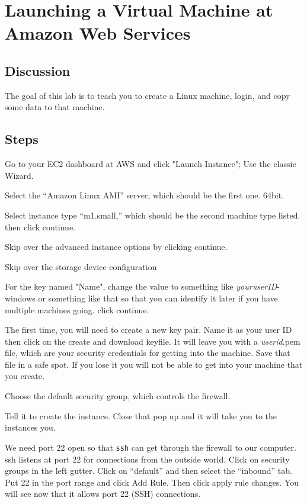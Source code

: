 \chapter{Launching a Virtual Machine at Amazon Web Services}
\label{ch:1}

\setcounter{problem}{1}

\section{Discussion}

\begin{fullwidth}

The goal of this lab is to teach you to create a Linux machine, login, and copy some data to that machine.

\section{Steps}

\step Go to your EC2 dashboard at AWS and click "Launch Instance"; Use the classic Wizard.

\step Select the ``Amazon Linux AMI'' server, which should be the first one. 64bit.

\step Select instance type ``m1.small,'' which should be the second machine type listed. then click continue.

\step Skip over the advanced instance options by clicking continue.

\step Skip over the storage device configuration

\step For the key named "Name", change the value to something like {\em youruserID}-windows or something like that so that you can identify it later if you have multiple machines going. click continue.

\step The first time, you will need to create a new key pair. Name it as your user ID then click on the create and download keyfile. It will leave you with a {\em userid}.pem file, which are your security credentials for getting into the machine. Save that file in a safe spot. If you lose it you will not be able to get into your machine that you create.

\step Choose the default security group, which controls the firewall.

\step Tell it to create the instance. Close that pop up and it will take you to the instances you.

\step We need port 22 open so that {\tt ssh} can get through the firewall to our computer. ssh listens at port 22 for connections from the outside world. Click on security groups in the left gutter. Click on ``default'' and then select the ``inbound'' tab. Put 22 in the port range and click Add Rule. Then click apply rule changes. You will see now that it allows port 22 (SSH) connections.


\end{fullwidth}
